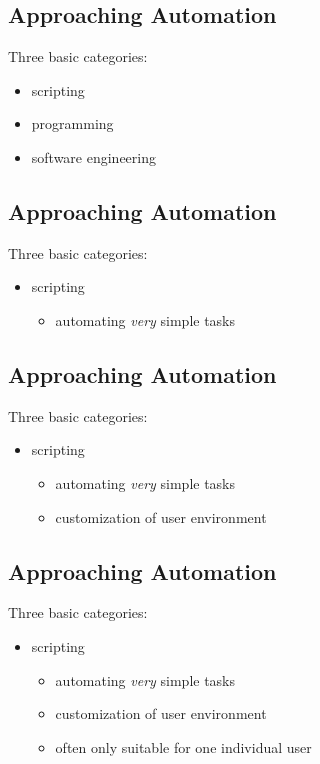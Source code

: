 \documentclass[xga]{xdvislides}
\begin{document}
\subsection{Approaching Automation}
Three basic categories:
\\

\begin{itemize}
	\item scripting
	\item programming
	\item software engineering
\end{itemize}

\subsection{Approaching Automation}
Three basic categories:
\\

\begin{itemize}
	\item scripting
		\begin{itemize}
			\item automating {\em very} simple tasks
		\end{itemize}
\end{itemize}

\subsection{Approaching Automation}
Three basic categories:
\\

\begin{itemize}
	\item scripting
		\begin{itemize}
			\item automating {\em very} simple tasks
			\item customization of user environment
		\end{itemize}
\end{itemize}

\subsection{Approaching Automation}
Three basic categories:
\\

\begin{itemize}
	\item scripting
		\begin{itemize}
			\item automating {\em very} simple tasks
			\item customization of user environment
			\item often only suitable for one individual user
		\end{itemize}
\end{itemize}
\end{document}
